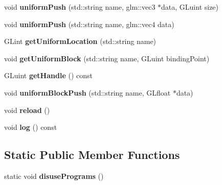 \begin{DoxyCompactItemize}
\item 
\hypertarget{classfillwave_1_1core_1_1Program_ad785b86a8a2206d013a9aabc1254c92e}{}void {\bfseries uniform\+Push} (std\+::string name, glm\+::vec3 $\ast$data, G\+Luint size)\label{classfillwave_1_1core_1_1Program_ad785b86a8a2206d013a9aabc1254c92e}

\item 
\hypertarget{classfillwave_1_1core_1_1Program_a6cb7e03c5611360fa707a73cad7ede60}{}void {\bfseries uniform\+Push} (std\+::string name, glm\+::vec4 data)\label{classfillwave_1_1core_1_1Program_a6cb7e03c5611360fa707a73cad7ede60}

\item 
\hypertarget{classfillwave_1_1core_1_1Program_aab14c8ac6f92f6355bf2f9bca4a86ce6}{}G\+Lint {\bfseries get\+Uniform\+Location} (std\+::string name)\label{classfillwave_1_1core_1_1Program_aab14c8ac6f92f6355bf2f9bca4a86ce6}

\item 
\hypertarget{classfillwave_1_1core_1_1Program_a29759df895f3acb8e4b5d3f130fa86ed}{}void {\bfseries get\+Uniform\+Block} (std\+::string name, G\+Luint binding\+Point)\label{classfillwave_1_1core_1_1Program_a29759df895f3acb8e4b5d3f130fa86ed}

\item 
\hypertarget{classfillwave_1_1core_1_1Program_a121d39af4f764668ab38fd248d95bb00}{}G\+Luint {\bfseries get\+Handle} () const \label{classfillwave_1_1core_1_1Program_a121d39af4f764668ab38fd248d95bb00}

\item 
\hypertarget{classfillwave_1_1core_1_1Program_a3c13702efd5a50eb1ad56e1d8367dea9}{}void {\bfseries uniform\+Block\+Push} (std\+::string name, G\+Lfloat $\ast$data)\label{classfillwave_1_1core_1_1Program_a3c13702efd5a50eb1ad56e1d8367dea9}

\item 
\hypertarget{classfillwave_1_1core_1_1Program_ad0caa02f8c63cd67fa8d8c8fc9b5092b}{}void {\bfseries reload} ()\label{classfillwave_1_1core_1_1Program_ad0caa02f8c63cd67fa8d8c8fc9b5092b}

\item 
\hypertarget{classfillwave_1_1core_1_1Program_a8ffce7e744becbc60c8957e43383ea81}{}void {\bfseries log} () const \label{classfillwave_1_1core_1_1Program_a8ffce7e744becbc60c8957e43383ea81}

\end{DoxyCompactItemize}
\subsection*{Static Public Member Functions}
\begin{DoxyCompactItemize}
\item 
\hypertarget{classfillwave_1_1core_1_1Program_a1caefe231bb4efd53480db32cda114ad}{}static void {\bfseries disuse\+Programs} ()\label{classfillwave_1_1core_1_1Program_a1caefe231bb4efd53480db32cda114ad}

\end{DoxyCompactItemize}



